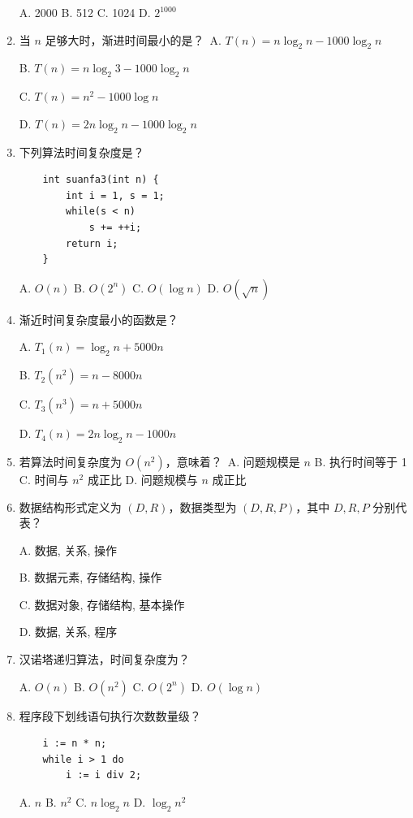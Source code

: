 \documentclass[lang=cn,newtx,10pt,scheme=chinese]{elegantbook}
\begin{document}
\begin{enumerate}
    A. 2000 \quad B. 512 \quad C. 1024 \quad D. $2^{1000}$

    \item 当 $n$ 足够大时，渐进时间最小的是？\
    A. $T(n)=n\log_2 n -1000\log_2 n$ \quad 
    
    B. $T(n)=n\log_2 3 -1000\log_2 n$ \

    C. $T(n)=n^2 -1000\log n$ \quad
    
    D. $T(n)=2n\log_2 n -1000\log_2 n$

    \item 下列算法时间复杂度是？
    \begin{verbatim}
    int suanfa3(int n) {
        int i = 1, s = 1;
        while(s < n)
            s += ++i;
        return i;
    }
    \end{verbatim}
    A. $O(n)$ \quad B. $O(2^n)$ \quad C. $O(\log n)$ \quad D. $O(\sqrt{n})$

    \item 渐近时间复杂度最小的函数是？\
    
    A. $T_1(n) = \log_2 n + 5000n$ \quad
    
    B. $T_2(n^2) = n - 8000n$ \

    C. $T_3(n^3) = n + 5000n$ \quad 
    
    D. $T_4(n) = 2n\log_2 n -1000n$

    \item 若算法时间复杂度为 $O(n^2)$，意味着？\
    A. 问题规模是 $n$ \quad B. 执行时间等于 1 \quad C. 时间与 $n^2$ 成正比 \quad D. 问题规模与 $n$ 成正比

    \item 数据结构形式定义为 $(D, R)$，数据类型为 $(D, R, P)$，其中 $D, R, P$ 分别代表？\
    
    A. 数据, 关系, 操作 \quad 
    
    B. 数据元素, 存储结构, 操作 \

    C. 数据对象, 存储结构, 基本操作 \quad 
    
    D. 数据, 关系, 程序

    \item 汉诺塔递归算法，时间复杂度为？\
    
    A. $O(n)$ \quad B. $O(n^2)$ \quad C. $O(2^n)$ \quad D. $O(\log n)$

    \item 程序段下划线语句执行次数数量级？
    \begin{verbatim}
    i := n * n;
    while i > 1 do
        i := i div 2;
    \end{verbatim}
    A. $n$ \quad B. ${n^2}$ \quad C. $n\log_2 n$ \quad D. $\log_2 n^2$


\end{enumerate}
\end{document}

